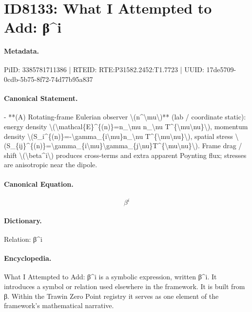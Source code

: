 \section*{ID8133: What I Attempted to Add: β\textasciicircum{}i}
\paragraph{Metadata.}
PiID: 3385781711386 | RTEID: RTE:P31582.2452:T1.7723 | UUID: 17de5709-0cdb-5b75-8f72-74d77b95a837

\paragraph{Canonical Statement.}
- **(A) Rotating-frame Eulerian observer \textbackslash{}(n\textasciicircum{}\textbackslash{}mu\textbackslash{})** (lab / coordinate static): energy density \textbackslash{}(\textbackslash{}mathcal\{E\}\textasciicircum{}\{(n)\}=n\_\textbackslash{}mu n\_\textbackslash{}nu T\textasciicircum{}\{\textbackslash{}mu\textbackslash{}nu\}\textbackslash{}), momentum density \textbackslash{}(S\_i\textasciicircum{}\{(n)\}=-\textbackslash{}gamma\_\{i\textbackslash{}mu\}n\_\textbackslash{}nu T\textasciicircum{}\{\textbackslash{}mu\textbackslash{}nu\}\textbackslash{}), spatial stress \textbackslash{}(S\_\{ij\}\textasciicircum{}\{(n)\}=\textbackslash{}gamma\_\{i\textbackslash{}mu\}\textbackslash{}gamma\_\{j\textbackslash{}nu\}T\textasciicircum{}\{\textbackslash{}mu\textbackslash{}nu\}\textbackslash{}). Frame drag / shift \textbackslash{}(\textbackslash{}beta\textasciicircum{}i\textbackslash{}) produces cross-terms and extra apparent Poynting flux; stresses are anisotropic near the dipole.

\paragraph{Canonical Equation.}
\[
\beta^i
\]

\paragraph{Dictionary.}
Relation: β\textasciicircum{}i

\paragraph{Encyclopedia.}
What I Attempted to Add: β\textasciicircum{}i is a symbolic expression, written β\textasciicircum{}i. It introduces a symbol or relation used elsewhere in the framework. It is built from β. Within the Trawin Zero Point registry it serves as one element of the framework's mathematical narrative.
